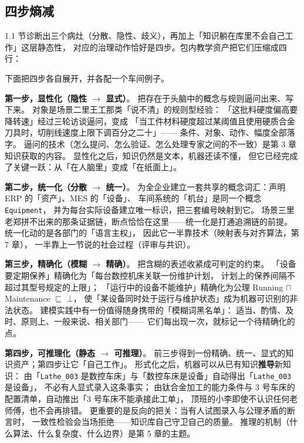\subsection{四步熵减}

1.1 节诊断出三个病灶（分散、隐性、歧义），再加上「知识躺在库里不会自己工作」这层静态性，
对应的治理动作恰好是四步。包内教学资产把它们压缩成四行：



下面把四步各自展开，并各配一个车间例子。

\textbf{第一步，显性化（隐性 \(\rightarrow\) 显式）}。
把存在于头脑中的概念与规则逼问出来、写下来。
对象是场景二里王工那类「说不清」的规则型经验：
「这批料硬度偏高要降转速」经过三轮访谈逼问，变成
「当工件材料硬度超过某阈值且使用硬质合金刀具时，切削线速度上限下调百分之二十」——
条件、对象、动作、幅度全部落字。
逼问的技术（怎么提问、怎么验证、怎么处理专家之间的不一致）是第 3 章知识获取的内容。
显性化之后，知识仍然是文本，机器还读不懂，
但它已经完成了关键一跃：从「在人脑里」变成「在纸面上」。

\textbf{第二步，统一化（分散 \(\rightarrow\) 统一）}。
为全企业建立一套共享的概念词汇：声明 ERP 的「资产」、MES 的「设备」、
车间系统的「机台」是同一个概念 \texttt{Equipment}，
并为每台实际设备建立唯一标识，把三套编号映射到它。
场景三里老郑拼不出来的那条证据链，断点恰恰在这里——统一化是打通追溯链的前提。
统一化动的是各部门的「语言主权」，
因此它一半靠技术（映射表与对齐算法，第 7 章），
一半靠上一节说的社会过程（评审与共识）。

\textbf{第三步，精确化（模糊 \(\rightarrow\) 精确）}。
把含糊的表述收紧成可判定的约束。
「设备要定期保养」精确化为「每台数控机床关联一份维护计划，
计划上的保养间隔不超过其型号规定的上限」；
「运行中的设备不能维护」精确化为公理
Running \(\sqcap\) Maintenance \(\sqsubseteq\) \(\bot\)，
使「某设备同时处于运行与维护状态」成为机器可识别的非法状态。
建模实践中有一份值得随身携带的「模糊词黑名单」：
适当、酌情、及时、原则上、一般来说、相关部门——
它们每出现一次，就标记一个待精确化的点。

\textbf{第四步，可推理化（静态 \(\rightarrow\) 可推理）}。
前三步得到一份精确、统一、显式的知识资产；第四步让它「自己工作」。
形式化之后，机器可以从已有知识\textbf{推导}新知识：
由「\texttt{Lathe\_003} 是数控车床」与「数控车床是设备」自动得出「\texttt{Lathe\_003} 是设备」，
不必有人显式录入这条事实；
由钛合金加工的能力条件与 3 号车床的配置清单，自动推出「3 号车床不能承接此工单」，
顶班的小李即使不认识任何老师傅，也不会再排错。
更重要的是反向的把关：当有人试图录入与公理矛盾的断言时，
一致性检验会当场拒绝——知识库自己守卫自己的质量。
推理的机制（什么算法、什么复杂度、什么边界）是第 5 章的主题。

